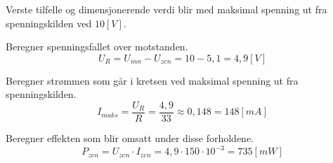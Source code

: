 \vspace{0.5cm} %

\begin{solution}[name=Løsningsforslag oppgave]
Verste tilfelle og dimensjonerende verdi blir med maksimal spenning ut fra spenningskilden ved $10 [V]$.

Beregner spenningsfallet over motstanden.
\[U_R=U_{inn}-U_{zen}=10-5,1=4,9[V]\]

Beregner strømmen som går i kretsen ved maksimal spenning ut fra spenningskilden.
\[I_{maks}=\frac{U_R}{R}=\frac{4,9}{33} \approx0,148 = 148 [mA]\]

Beregner effekten som blir omsatt under disse forholdene.
\[P_{zen}=U_{zen}\cdot I_{zen}= 4,9\cdot 150\cdot 10^{-3}=735[mW]\]

\end{solution}





